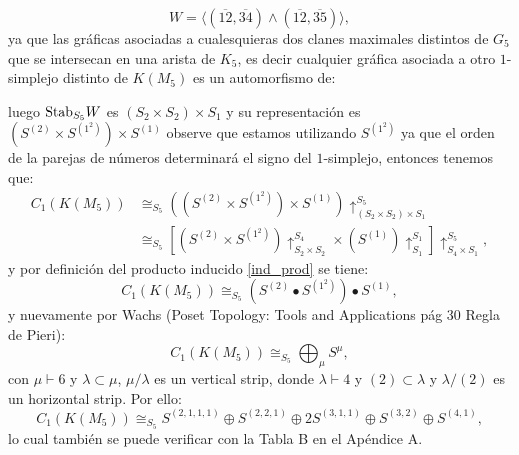 \documentclass[12pt]{book}
\theoremstyle{definition}
\newcounter{in}
\newcounter{ini}
\begin{document}
 $$W = \langle (\overline{12},\overline{34}) \wedge  (\overline{12},\overline{35}) \rangle,$$
ya que las gráficas asociadas a cualesquieras dos clanes maximales distintos de $G_{5}$ que se intersecan en una arista de $K_{5}$, es decir cualquier gráfica asociada a otro $1$-simplejo distinto de $K(M_{5})$ es un automorfismo de:
\begin{center}
\end{center}
luego $\textup{Stab}_{S_{5}} W$ es $(S_{2} \times S_{2}) \times S_{1}$ y su representación es $(S^{(2)} \times S^{(1^{2})}) \times S^{(1)}$ observe que estamos utilizando $S^{(1^{2})}$ ya que el orden de la parejas de números determinará el signo del $1$-simplejo, entonces tenemos que:
\begin{equation}
\begin{aligned}
C_{1}(K(M_{5})) & \cong_{S_{5}} ((S^{(2)} \times S^{(1^{2})}) \times S^{(1)})\uparrow_{(S_{2} \times S_{2}) \times S_{1}}^{S_{5}} \\
& \cong_{S_{5}} \left [ (S^{(2)} \times S^{(1^{2})})\uparrow_{S_{2} \times S_{2}}^{S_{4}} \times (S^{(1)})\uparrow_{S_{1}}^{S_{1}} \right ] \uparrow_{S_{4} \times S_{1}}^{S_{5}},
\end{aligned}
\end{equation}
y por definición del producto inducido \ref{ind_prod} se tiene:
\begin{equation}
C_{1}(K(M_{5})) \cong_{S_{5}} (S^{(2)} \bullet S^{(1^{2})}) \bullet S^{(1)}, 
\end{equation}
y nuevamente por Wachs (Poset Topology: Tools and Applications pág 30 Regla de Pieri):
\begin{equation}
C_{1}(K(M_{5})) \cong_{S_{5}} \bigoplus_{\mu} S^{\mu}, 
\end{equation}
con $\mu \vdash 6$ y $\lambda \subset \mu$, $\mu / \lambda$ es un vertical strip, donde $\lambda \vdash 4$ y $(2) \subset \lambda$ y $\lambda / (2)$ es un horizontal strip. Por ello:
\begin{equation*}
C_{1}(K(M_{5})) \cong_{S_{5}} S^{(2,1,1,1)} \oplus S^{(2,2,1)} \oplus 2S^{(3,1,1)} \oplus S^{(3,2)} \oplus S^{(4,1)},
\end{equation*}
lo cual también se puede verificar con la Tabla B en el Apéndice A.
\end{document}
